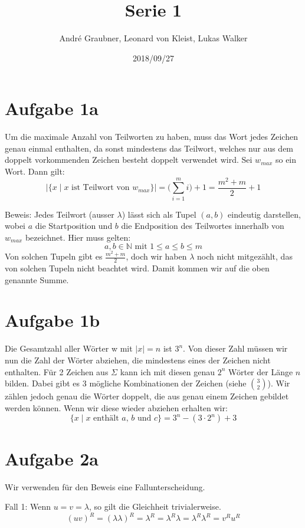 \documentclass[a4paper]{article}
\title{Serie 1}
\author{André Graubner, Leonard von Kleist, Lukas Walker}
\date{2018/09/27}
\begin{document}
 

\maketitle

\section{Aufgabe 1a}
	Um die maximale Anzahl von Teilworten zu haben,
	muss das Wort jedes Zeichen genau einmal enthalten, 
	da sonst mindestens das Teilwort, welches nur aus 
	dem doppelt vorkommenden Zeichen besteht doppelt 
	verwendet wird. Sei $w_{max}$ so ein Wort. Dann gilt:
	\[\Bigg\lvert \Big\{x \mid x \text{ ist Teilwort von } w_{max} \Big\} \Bigg\lvert = 
	\bigg(\sum_{i=1}^{m} i\bigg) + 1 = \frac{m^2 + m}{2} + 1 \]

	Beweis:
	Jedes Teilwort (ausser $\lambda$) lässt sich als Tupel $(a,b)$ eindeutig darstellen,
	wobei $a$ die Startposition und $b$ die Endposition des Teilwortes
	innerhalb von $w_{max}$ bezeichnet. Hier muss gelten:
	\[a, b \in \mathbb{N} \text{ mit } 1 \leq a \leq b \leq m\]
	Von solchen Tupeln gibt es $\frac{m^2 + m}{2}$, doch wir haben $\lambda$
	noch nicht mitgezählt, das von solchen Tupeln nicht beachtet wird.
	Damit kommen wir auf die oben genannte Summe.

\section{Aufgabe 1b}
	Die Gesamtzahl aller Wörter w mit $\lvert x \rvert = n$ ist $3^n$.
	Von dieser Zahl müssen wir nun die Zahl der Wörter abziehen, die
	mindestens eines der Zeichen nicht enthalten. Für 2 Zeichen aus 
	$\Sigma$ kann ich mit diesen genau $2^n$ Wörter der Länge $n$ bilden.
	Dabei gibt es 3 mögliche Kombinationen der Zeichen (siehe $\binom{3}{2}$).
	Wir zählen jedoch genau die Wörter doppelt, die aus genau einem
	Zeichen gebildet werden können. Wenn wir diese wieder abziehen erhalten wir:
	\[\big\{x \mid \text{$x$ enthält $a$, $b$ und $c$} \big\} = 3^n - (3 \cdot 2^n) + 3\]

\section{Aufgabe 2a}
	Wir verwenden für den Beweis eine Fallunterscheidung.

	Fall 1: Wenn $u = v = \lambda$, so gilt die Gleichheit trivialerweise.
	\[(uv)^R = (\lambda\lambda)^R = \lambda^R = \lambda^R \lambda = \lambda^R \lambda^R = v^R u^R\]
\end{document}
